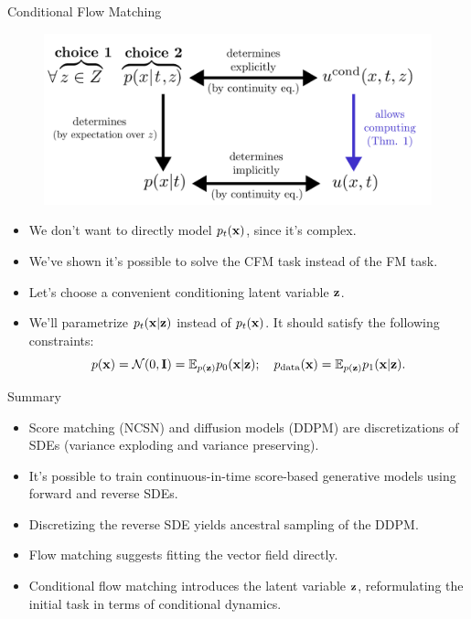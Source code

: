 \documentclass{beamer}
\begin{document}
\begin{frame}{Conditional Flow Matching}
	\begin{figure}
		\centering
		\includegraphics[width=0.75\linewidth]{figs/cfm_uncond_to_cond}
	\end{figure}
    \eqpause
	\begin{itemize}
		\item We don't want to directly model $p_t(\mathbf{x})$, since it's complex.
		\item We've shown it's possible to solve the CFM task instead of the FM task.
		\item Let's choose a convenient conditioning latent variable $\mathbf{z}$.
		\item We'll parametrize $p_t(\mathbf{x} | \mathbf{z})$ instead of $p_t(\mathbf{x})$. It should satisfy the following constraints:
		\[
			p(\mathbf{x}) = \mathcal{N}(0, \mathbf{I}) = \mathbb{E}_{p(\mathbf{z})} p_0(\mathbf{x} | \mathbf{z}); \quad p_{\text{data}}(\mathbf{x}) = \mathbb{E}_{p(\mathbf{z})} p_1(\mathbf{x} | \mathbf{z}).
		\]
	\end{itemize}
\end{frame}
\begin{frame}{Summary}
	\begin{itemize}
		\item Score matching (NCSN) and diffusion models (DDPM) are discretizations of SDEs (variance exploding and variance preserving).
		\vfill
		\item It's possible to train continuous-in-time score-based generative models using forward and reverse SDEs.
		\vfill
		\item Discretizing the reverse SDE yields ancestral sampling of the DDPM.
		\vfill
		\item Flow matching suggests fitting the vector field directly.
		\vfill 
		\item Conditional flow matching introduces the latent variable $\mathbf{z}$, reformulating the initial task in terms of conditional dynamics.
	\end{itemize}
\end{frame}
\end{document}
